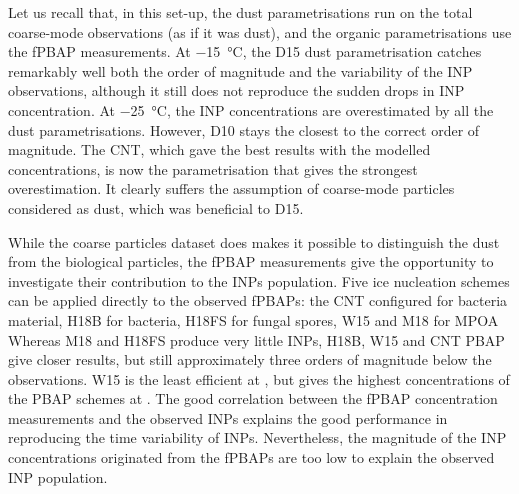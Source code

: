    Let us recall that, in this set-up, the dust parametrisations run on the total coarse-mode observations (as if it was  dust), and the organic parametrisations use the fPBAP measurements.
   At \SI{-15}{\degreeCelsius}, the D15 dust parametrisation catches remarkably well both the order of magnitude and the variability of the INP observations, although it still does not reproduce the sudden drops in INP concentration. %
   At \SI{-25}{\degreeCelsius}, the INP concentrations are overestimated by all the dust parametrisations. However, D10 stays the closest to the correct order of magnitude.
   The CNT, which gave the best results with the modelled concentrations, is now the parametrisation that gives the strongest overestimation. It clearly suffers the assumption of coarse-mode particles considered as dust, which was beneficial to D15.
   
   While the coarse particles dataset does makes it possible to distinguish the dust from the biological particles, the fPBAP measurements give the opportunity to investigate their contribution to the INPs population.
   Five ice nucleation schemes can be applied directly to the observed fPBAPs: the CNT \citep{keita_new_2020} configured for bacteria material, H18B for bacteria, H18FS for fungal spores, W15 and M18 for MPOA  %
   Whereas M18 and H18FS produce very little INPs, H18B, W15 and CNT PBAP give closer results, but still approximately three orders of magnitude below the observations. 
   W15 is the least efficient at , but gives the highest concentrations of the PBAP schemes at .
   The good correlation between the fPBAP concentration measurements and the observed INPs explains the good performance in reproducing the time variability of INPs. Nevertheless, the magnitude of the INP concentrations originated from the fPBAPs are too low to explain the observed INP population.
   
   
